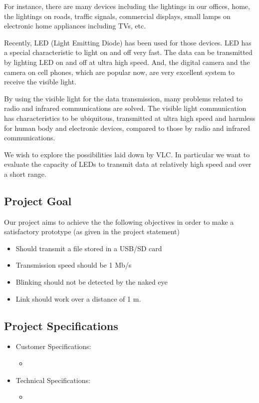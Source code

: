 \documentclass{article}
\begin{document}
For instance, there are many devices including the lightings in our offices, home, the lightings on roads, traffic signals, commercial displays, small lamps on electronic home appliances including TVs, etc. 

Recently, LED (Light Emitting Diode) has been used for those devices. LED has a special characteristic to light on and off very fast. The data can be transmitted by lighting LED on and off at ultra high speed. And, the digital camera and the camera on cell phones, which are popular now, are very excellent system to receive the visible light. 

By using the visible light for the data transmission, many problems related to radio and infrared communications are solved. The visible light communication has characteristics to be ubiquitous, transmitted at ultra high speed and harmless for human body and electronic devices, compared to those by radio and infrared communications.

We wish to explore the possibilities laid down by VLC. In particular we want to evaluate the capacity of LEDs to transmit data at relatively high speed and over a short range. 

\subsection{Project Goal}

Our project aims to achieve the the following objectives in order to make a satisfactory prototype (as given in the project statement)
\begin{itemize}
\item Should transmit a file stored in a USB/SD card
\item Transmission speed should be 1 Mb/s
\item Blinking should not be detected by the naked eye
\item Link should work over a distance of 1 m.
\end{itemize}

\subsection{Project Specifications}
\begin{itemize}
\item Customer Specifications:
  \begin{itemize}
  \item                         %
  \end{itemize}
\item Technical Specifications: 
  \begin{itemize}
  \item %
  \end{itemize}
\end{itemize}
\end{document}
